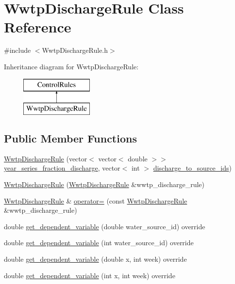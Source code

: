 \hypertarget{classWwtpDischargeRule}{}\section{Wwtp\+Discharge\+Rule Class Reference}
\label{classWwtpDischargeRule}


{\ttfamily \#include $<$Wwtp\+Discharge\+Rule.\+h$>$}

Inheritance diagram for Wwtp\+Discharge\+Rule\+:\begin{figure}[H]
\begin{center}
\leavevmode
\includegraphics[height=2.000000cm]{classWwtpDischargeRule}
\end{center}
\end{figure}
\subsection*{Public Member Functions}
\begin{DoxyCompactItemize}
\item 
\mbox{\hyperlink{classWwtpDischargeRule_ae904657855c9d983ea0e5995109cd561}{Wwtp\+Discharge\+Rule}} (vector$<$ vector$<$ double $>$$>$ \mbox{\hyperlink{classWwtpDischargeRule_a5d193e0cbc2eb23e1b86e79fb2eafad3}{year\+\_\+series\+\_\+fraction\+\_\+discharge}}, vector$<$ int $>$ \mbox{\hyperlink{classWwtpDischargeRule_ac2f77a9fca93eef3fd26ff1d579130be}{discharge\+\_\+to\+\_\+source\+\_\+ids}})
\item 
\mbox{\hyperlink{classWwtpDischargeRule_ac433e50df1414ba4bbb40022832b43ff}{Wwtp\+Discharge\+Rule}} (\mbox{\hyperlink{classWwtpDischargeRule}{Wwtp\+Discharge\+Rule}} \&wwtp\+\_\+discharge\+\_\+rule)
\item 
\mbox{\hyperlink{classWwtpDischargeRule}{Wwtp\+Discharge\+Rule}} \& \mbox{\hyperlink{classWwtpDischargeRule_acde020b347aff843179a318a9d231c8f}{operator=}} (const \mbox{\hyperlink{classWwtpDischargeRule}{Wwtp\+Discharge\+Rule}} \&wwtp\+\_\+discharge\+\_\+rule)
\item 
double \mbox{\hyperlink{classWwtpDischargeRule_a4cea07bf746d200c9ca3018405a77a46}{get\+\_\+dependent\+\_\+variable}} (double water\+\_\+source\+\_\+id) override
\item 
double \mbox{\hyperlink{classWwtpDischargeRule_a3338c0fc43d656a6730ca72dd5d3e51e}{get\+\_\+dependent\+\_\+variable}} (int water\+\_\+source\+\_\+id) override
\item 
double \mbox{\hyperlink{classWwtpDischargeRule_a10eb6f901b6479dadc107e0a7c07e03b}{get\+\_\+dependent\+\_\+variable}} (double x, int week) override
\item 
double \mbox{\hyperlink{classWwtpDischargeRule_a8eade5d595ec0fdc76769e67c7ffc5f4}{get\+\_\+dependent\+\_\+variable}} (int x, int week) override
\end{DoxyCompactItemize}
